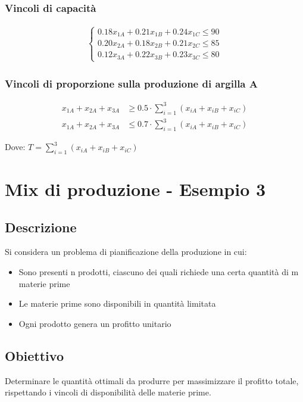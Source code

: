 \subsubsection{Vincoli di capacità}
\begin{align}
\begin{cases}
    0.18x_{1A}+0.21x_{1B}+0.24x_{1C} \leq 90 \\
    0.20x_{2A}+0.18x_{2B}+0.21x_{2C} \leq 85 \\
    0.12x_{3A}+0.22x_{3B}+0.23x_{3C} \leq 80
\end{cases}
\end{align}

\subsubsection{Vincoli di proporzione sulla produzione di argilla A}
\begin{align}
x_{1A}+x_{2A}+x_{3A} &\geq 0.5 \cdot \sum_{i=1}^{3}(x_{iA}+x_{iB}+x_{iC}) \\
x_{1A}+x_{2A}+x_{3A} &\leq 0.7 \cdot \sum_{i=1}^{3}(x_{iA}+x_{iB}+x_{iC})
\end{align}

Dove: $T = \sum_{i=1}^{3}(x_{iA}+x_{iB}+x_{iC})$

\section{Mix di produzione - Esempio 3}

\subsection{Descrizione}
Si considera un problema di pianificazione della produzione in cui:
\begin{itemize}
    \item Sono presenti n prodotti, ciascuno dei quali richiede una certa quantità di m materie prime
    \item Le materie prime sono disponibili in quantità limitata
    \item Ogni prodotto genera un profitto unitario
\end{itemize}

\subsection{Obiettivo}
Determinare le quantità ottimali da produrre per massimizzare il profitto totale, rispettando i vincoli di disponibilità delle materie prime.


